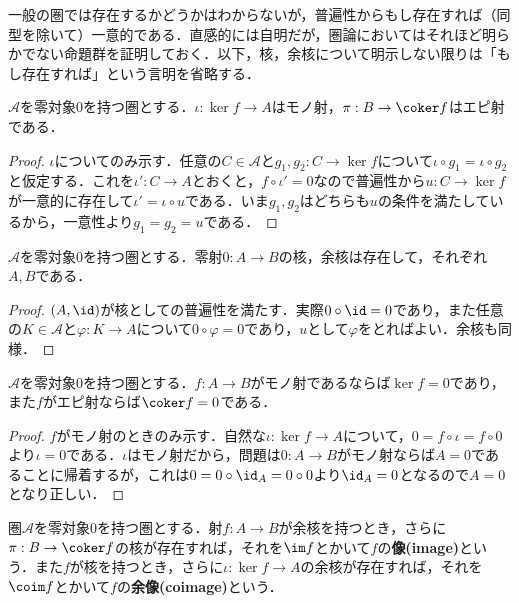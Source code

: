 一般の圏では存在するかどうかはわからないが，普遍性からもし存在すれば（同型を除いて）一意的である．直感的には自明だが，圏論においてはそれほど明らかでない命題群を証明しておく．以下，核，余核について明示しない限りは「もし存在すれば」という言明を省略する．

\begin{prop}\label{prop:核はモノ}
	$\mathscr{A}$を零対象$0$を持つ圏とする．$\iota:\ker f\to A$はモノ射，$\pi:B\to\coker f$はエピ射である．
\end{prop}

\begin{proof}
	$\iota$についてのみ示す．任意の$C\in\mathscr{A}$と$g_1,g_2:C\to\ker f$について$\iota\circ g_1=\iota\circ g_2$と仮定する．これを$\iota':C\to A$とおくと，$f\circ\iota'=0$なので普遍性から$u:C\to\ker f$が一意的に存在して$\iota'=\iota\circ u$である．いま$g_1,g_2$はどちらも$u$の条件を満たしているから，一意性より$g_1=g_2=u$である．
\end{proof}

\begin{prop}\label{prop:0射の核と余核}
	$\mathscr{A}$を零対象$0$を持つ圏とする．零射$0:A\to B$の核，余核は存在して，それぞれ$A,B$である．
\end{prop}

\begin{proof}
	$(A,\id)$が核としての普遍性を満たす．実際$0\circ\id=0$であり，また任意の$K\in\mathscr{A}$と$\varphi:K\to A$について$0\circ\varphi=0$であり，$u$として$\varphi$をとればよい．余核も同様．
\end{proof}

\begin{prop}\label{prop:モノ射の核は0}
	$\mathscr{A}$を零対象$0$を持つ圏とする．$f:A\to B$がモノ射であるならば$\ker f=0$であり，また$f$がエピ射ならば$\coker f=0$である．	
\end{prop}

\begin{proof}
	$f$がモノ射のときのみ示す．自然な$\iota:\ker f\to A$について，$0=f\circ\iota=f\circ0$より$\iota=0$である．$\iota$はモノ射だから，問題は$0:A\to B$がモノ射ならば$A=0$であることに帰着するが，これは$0=0\circ\id_A=0\circ0$より$\id_A=0$となるので$A=0$となり正しい．
\end{proof}

\begin{defi}[射の像と余像]
	圏$\mathscr{A}$を零対象$0$を持つ圏とする．射$f:A\to B$が余核を持つとき，さらに$\pi:B\to\coker f$の核が存在すれば，それを$\im f$とかいて$f$の\textbf{像(image)}という．また$f$が核を持つとき，さらに$\iota:\ker f\to A$の余核が存在すれば，それを$\coim f$とかいて$f$の\textbf{余像(coimage)}という．
\end{defi}

